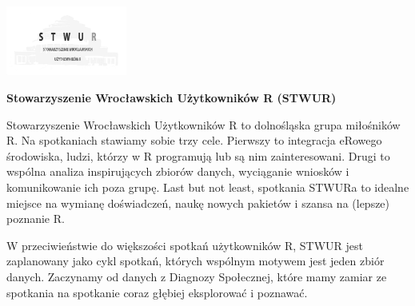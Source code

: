 \documentclass[\main/boa.tex]{subfiles}
\begin{document}
	
	\begin{minipage}[t]{0.915\textwidth}
		\center     
		\includegraphics[width=150px]{img/logos.bw/stwur.png} 
	\end{minipage}
	\begin{center}
	\Large \textbf {Stowarzyszenie Wrocławskich Użytkowników R (STWUR)}
	\end{center}
	
	\vskip 0.3cm
	\normalsize 
	Stowarzyszenie Wrocławskich Użytkowników R to dolnośląska grupa miłośników R. Na spotkaniach stawiamy sobie trzy cele. Pierwszy to integracja eRowego środowiska, ludzi, którzy w R programują lub są nim zainteresowani. Drugi to wspólna analiza inspirujących zbiorów danych, wyciąganie wniosków i komunikowanie ich poza grupę. Last but not least, spotkania STWURa to idealne miejsce na wymianę doświadczeń, naukę nowych pakietów i szansa na (lepsze) poznanie R.
	
	W przeciwieństwie do większości spotkań użytkowników R, STWUR jest zaplanowany jako cykl spotkań, których wspólnym motywem jest jeden zbiór danych. Zaczynamy od danych z Diagnozy Społecznej, które mamy zamiar ze spotkania na spotkanie coraz głębiej eksplorować i poznawać.
	
	\vskip 1.5cm
\end{document}
